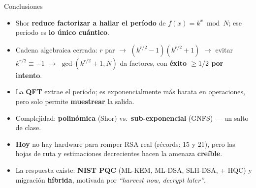 \documentclass[aspectratio=169]{beamer}
\begin{document}
\begin{frame}{Conclusiones}
  \begin{itemize}
    \setlength\itemsep{0.4em}
    \item Shor \textbf{reduce factorizar a hallar el período} de
          $f(x)=k^x\bmod N$; ese período es \textbf{lo único cuántico}.
    \item Cadena algebraica cerrada: $r$ par $\to$ $(k^{r/2}-1)(k^{r/2}+1)$
          $\to$ evitar $k^{r/2}\equiv-1$ $\to$ $\gcd(k^{r/2}\pm1,N)$ da
          factores, con \textbf{éxito $\geq 1/2$ por intento}.
    \item La \textbf{QFT} extrae el período; es exponencialmente más barata
          en operaciones, pero solo permite \textbf{muestrear} la salida.
    \item Complejidad: \textbf{polinómica} (Shor) vs.\ \textbf{sub-exponencial}
          (GNFS) — un salto de clase.
    \item \textbf{Hoy} no hay hardware para romper RSA real (récords: 15 y 21),
          pero las hojas de ruta y estimaciones decrecientes hacen la amenaza
          \textbf{creíble}.
    \item La respuesta existe: \textbf{NIST PQC} (ML-KEM, ML-DSA, SLH-DSA,
          + HQC) y migración \textbf{híbrida}, motivada por
          \emph{``harvest now, decrypt later''}.
  \end{itemize}

\end{frame}
\end{document}
